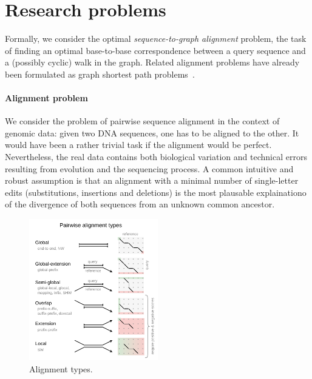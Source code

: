 \section*{Research problems}

Formally, we consider the optimal \emph{sequence-to-graph alignment} problem,
the task of finding an optimal base-to-base correspondence between a query
sequence and a (possibly cyclic) walk in the graph. Related alignment problems
have already been formulated as graph shortest path
problems~\cite{jain_complexity_2019}.

\paragraph{Alignment problem}
We consider the problem of pairwise sequence alignment in the context of genomic
data: given two DNA sequences, one has to be aligned to the other. It would have
been a rather trivial task if the alignment would be perfect. Nevertheless, the
real data contains both biological variation and technical errors resulting from
evolution and the sequencing process. A common intuitive and robust assumption
is that an alignment with a minimal number of single-letter edits
(substitutions, insertions and deletions) is the most plausable explainationo of
the divergence of both sequences from an unknown common ancestor.

\begin{figure}[t]  %
    \includegraphics[width=0.5\textwidth]{alignment-types}
	\caption[Alignment types]{Alignment types.}
    \label{fig:alignment-types}
\end{figure}
